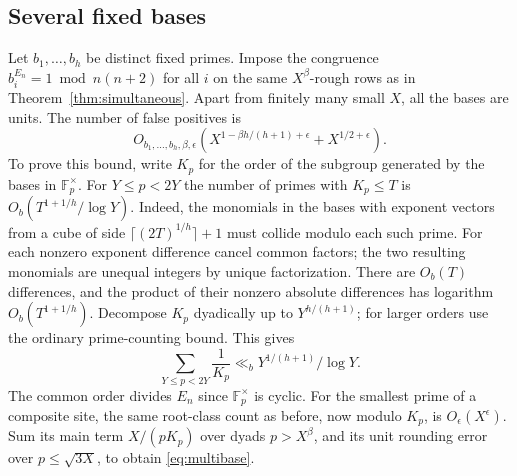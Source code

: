 \documentclass[11pt]{article}
\begin{document}
\subsection{Several fixed bases}
Let \(b_1,\ldots,b_h\) be distinct fixed primes. Impose the congruence
\(b_i^{E_n}=1\bmod n(n+2)\) for all \(i\) on the same \(X^\beta\)-rough
rows as in Theorem~\ref{thm:simultaneous}. Apart from finitely many
small \(X\), all the bases are units. The number of false positives is
\begin{equation}\label{eq:multibase}
 O_{b_1,\ldots,b_h,\beta,\epsilon}
    (X^{1-\beta h/(h+1)+\epsilon}+X^{1/2+\epsilon}).
\end{equation}
To prove this bound, write \(K_p\) for the order of the subgroup
generated by the bases in \(\mathbb F_p^\times\). For
\(Y\le p<2Y\) the number of primes with \(K_p\le T\) is
\(O_b(T^{1+1/h}/\log Y)\).
Indeed, the monomials in the bases with exponent vectors from a cube
of side \(\lceil(2T)^{1/h}\rceil+1\) must collide modulo each such
prime. For each nonzero exponent difference cancel common factors;
the two resulting monomials are unequal integers by unique
factorization. There are \(O_b(T)\) differences, and the product of
their nonzero absolute differences has logarithm \(O_b(T^{1+1/h})\).
Decompose \(K_p\) dyadically up to \(Y^{h/(h+1)}\); for larger
orders use the ordinary prime-counting bound. This gives
\[
 \sum_{Y\le p<2Y}\frac1{K_p}\ll_b Y^{1/(h+1)}/\log Y.
\]
The common order divides \(E_n\) since \(\mathbb F_p^\times\) is cyclic.
For the smallest prime of a composite site, the same root-class
count as before, now modulo \(K_p\), is \(O_\epsilon(X^\epsilon)\).
Sum its main term \(X/(pK_p)\) over dyads \(p>X^\beta\), and its
unit rounding error over \(p\le\sqrt{3X}\), to obtain
\eqref{eq:multibase}.
\end{document}
